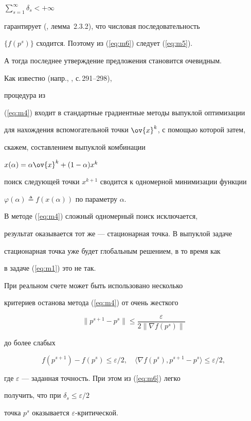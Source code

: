 $\sum\limits_{s=1}^{\infty}\delta_{s} < +\infty $


гарантирует ({\cite{l1}, лемма~2.3.2}), что числовая последовательность


$\{f(p^{s})\}$ сходится. Поэтому из (\ref{eq:m6}) следует (\ref{eq:m5}).


А тогда последнее утверждение предложения становится очевидным.





\begin{note}


Как известно (напр., \cite{l1}, с.\,291--298),


процедура из


(\ref{eq:m4}) входит в стандартные градиентные методы выпуклой оптимизации


для нахождения вспомогательной точки $\ov{x}^{k}$, с помощью которой затем,


скажем, составлением выпуклой комбинации 


$x(\alpha)=\alpha \ov{x}^{k}+(1-\alpha)x^{k}$


поиск следующей точки $x^{k+1}$ сводится к одномерной минимизации функции


$\varphi (\alpha)\triangleq f(x(\alpha))$ по параметру $\alpha$.


В методе (\ref{eq:m4}) сложный одномерный поиск исключается,


результат оказывается тот же --- стационарная точка. В выпуклой задаче


стационарная точка уже будет глобальным решением, в то время как 


в задаче (\ref{eq:m1}) это не так.


\end{note}





\begin{note}


При реальном счете может быть использовано несколько 


критериев останова метода (\ref{eq:m4}) от очень жесткого


$$


\| p^{s+1}-p^{s} \| \leq \frac{\varepsilon}{2\| \nabla f(p^{s}) \|}


$$


до более слабых


$$


f(p^{s+1})-f(p^{s})\leq \varepsilon/2,\quad


\langle \nabla f(p^{s}), p^{s+1} - p^{s}\rangle \leq 


\varepsilon/2,


$$


где $\varepsilon$ --- заданная точность. При этом из (\ref{eq:m6}) легко


получить, что при $\delta_{s} \leq \varepsilon/2$


точка $p^{s}$ оказывается $\varepsilon$-критической.


\end{note}





